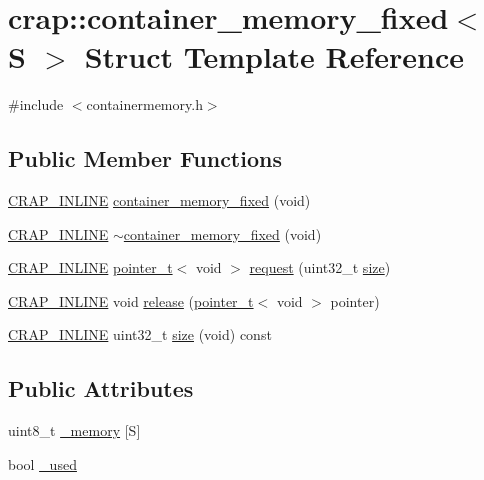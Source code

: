 \hypertarget{structcrap_1_1container__memory__fixed}{}\section{crap\+:\+:container\+\_\+memory\+\_\+fixed$<$ S $>$ Struct Template Reference}
\label{structcrap_1_1container__memory__fixed}


{\ttfamily \#include $<$containermemory.\+h$>$}

\subsection*{Public Member Functions}
\begin{DoxyCompactItemize}
\item 
\hyperlink{config__x86_8h_a5a40526b8d842e7ff731509998bb0f1c}{C\+R\+A\+P\+\_\+\+I\+N\+L\+I\+N\+E} \hyperlink{structcrap_1_1container__memory__fixed_a53da8459f3fcb3cff6208ad641fd654b}{container\+\_\+memory\+\_\+fixed} (void)
\item 
\hyperlink{config__x86_8h_a5a40526b8d842e7ff731509998bb0f1c}{C\+R\+A\+P\+\_\+\+I\+N\+L\+I\+N\+E} \hyperlink{structcrap_1_1container__memory__fixed_ae94b8e1488ecb93db2eee0a54530ae51}{$\sim$container\+\_\+memory\+\_\+fixed} (void)
\item 
\hyperlink{config__x86_8h_a5a40526b8d842e7ff731509998bb0f1c}{C\+R\+A\+P\+\_\+\+I\+N\+L\+I\+N\+E} \hyperlink{structcrap_1_1pointer__t}{pointer\+\_\+t}$<$ void $>$ \hyperlink{structcrap_1_1container__memory__fixed_ad9ae89cb1c3e5bb95d80c76309710dbf}{request} (uint32\+\_\+t \hyperlink{structcrap_1_1container__memory__fixed_af33254a0f8d522cc64c3342def6f8dea}{size})
\item 
\hyperlink{config__x86_8h_a5a40526b8d842e7ff731509998bb0f1c}{C\+R\+A\+P\+\_\+\+I\+N\+L\+I\+N\+E} void \hyperlink{structcrap_1_1container__memory__fixed_a54ba61f6d06fa03365fc9c1fefebfcb4}{release} (\hyperlink{structcrap_1_1pointer__t}{pointer\+\_\+t}$<$ void $>$ pointer)
\item 
\hyperlink{config__x86_8h_a5a40526b8d842e7ff731509998bb0f1c}{C\+R\+A\+P\+\_\+\+I\+N\+L\+I\+N\+E} uint32\+\_\+t \hyperlink{structcrap_1_1container__memory__fixed_af33254a0f8d522cc64c3342def6f8dea}{size} (void) const 
\end{DoxyCompactItemize}
\subsection*{Public Attributes}
\begin{DoxyCompactItemize}
\item 
uint8\+\_\+t \hyperlink{structcrap_1_1container__memory__fixed_aca7e7c7805d9307b7067b736e9b4647f}{\+\_\+memory} \mbox{[}S\mbox{]}
\item 
bool \hyperlink{structcrap_1_1container__memory__fixed_aa017408f7c4feeb5fe1ad88338a237ab}{\+\_\+used}
\end{DoxyCompactItemize}


